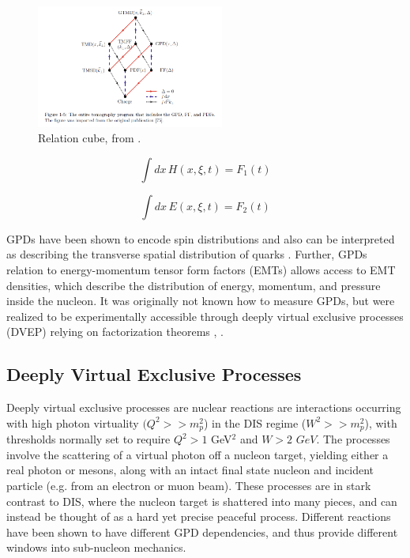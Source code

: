             \begin{figure}[H]
                \centering
                \includegraphics[width=0.55\textwidth,trim={3cm 1.5cm 3cm 0},clip]{Chapters/Ch1-Intro/Ch1-Sec2-GPDs-DVMP/pics/gtmd-cube-sangbaek.png}
                \caption[Distribution Relationship Cube]{Relation cube, from \parencite{Burkardt2016ModellingStructure}. }
                \label{fig:gmtd_cube}
            \end{figure}
        
        \begin{equation}\label{gpd_f1}
        \int dx \, H(x, \xi, t) = F_1(t)
        \end{equation}
        
        \begin{equation}\label{gpd_f2}
        \int dx \, E(x, \xi, t) = F_2(t)
        \end{equation}


        GPDs have been shown \parencite{Ji1997Gauge-InvariantSpin} to encode spin distributions and also can be interpreted as describing the transverse spatial distribution of quarks \parencite{Burkardt2007GPDs0}. Further, GPDs relation to energy-momentum tensor form factors (EMTs) allows access to EMT densities, which describe the distribution of energy, momentum, and pressure inside the nucleon. It was originally not known how to measure GPDs, but were realized to be experimentally accessible through deeply virtual exclusive processes (DVEP) relying on factorization theorems \parencite{Collins1999ProofQCD}, \parencite{Bauer2002HardTheory}. 
           
    
    
    \subsection{Deeply Virtual Exclusive Processes}

        Deeply virtual exclusive processes are nuclear reactions are interactions occurring with high photon virtuality $(Q^2 >> m_p^2$) in the DIS regime ($W^2>>m_p^2$), with thresholds normally set to require  $Q^2 > 1$ GeV$^2$ and $W>2$ $GeV$. The processes involve the scattering of a virtual photon off a nucleon target, yielding either a real photon or mesons, along with an intact final state nucleon and incident particle (e.g. from an electron or muon beam). These processes are in stark contrast to DIS, where the nucleon target is shattered into many pieces, and can instead be thought of as a hard yet precise peaceful process. Different reactions have been shown to have different GPD dependencies, and thus provide different windows into sub-nucleon mechanics. 

